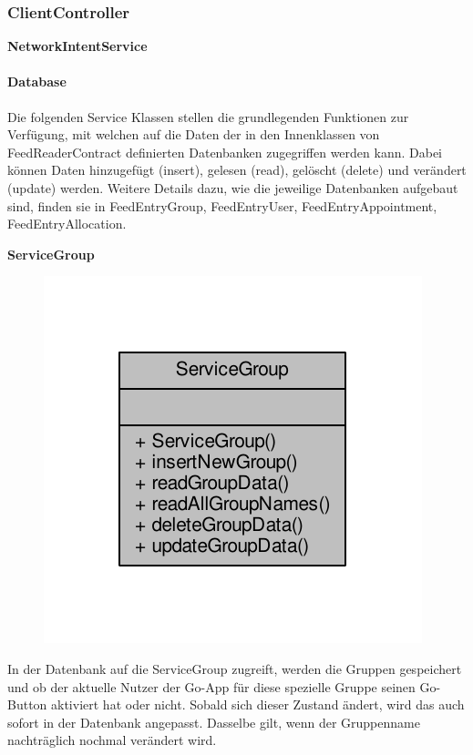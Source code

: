 \subsubsection{ClientController}

\textbf{NetworkIntentService}

\paragraph{Database}

Die folgenden Service Klassen stellen die grundlegenden Funktionen zur Verfügung, mit welchen auf die Daten der in den Innenklassen von FeedReaderContract definierten Datenbanken zugegriffen werden kann. Dabei können Daten hinzugefügt (insert), gelesen (read), gelöscht (delete) und verändert (update) werden.
Weitere Details dazu, wie die jeweilige Datenbanken aufgebaut sind, finden sie in FeedEntryGroup, FeedEntryUser, FeedEntryAppointment, FeedEntryAllocation.

\textbf{ServiceGroup}
\begin{figure}[H]
	\includegraphics[scale = 1]{res/umlClasses/service_group__coll__graph.pdf}
	\centering
\end{figure}
In der Datenbank auf die ServiceGroup zugreift, werden die Gruppen gespeichert und ob der aktuelle Nutzer der Go-App für diese spezielle Gruppe seinen Go-Button aktiviert hat oder nicht. Sobald sich dieser Zustand ändert, wird das auch sofort in der Datenbank angepasst. Dasselbe gilt, wenn der Gruppenname nachträglich nochmal verändert wird.


